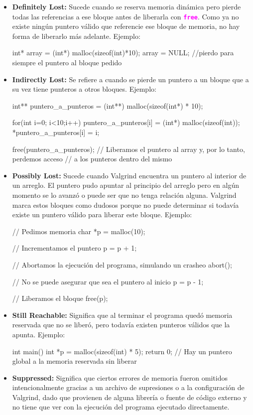 \documentclass[]{scrartcl}
\newcommand{\hl}[1]{\textcolor{magenta}{\textbf{\texttt{#1}}}}
\begin{document}
\begin{itemize}
  \item \textbf{Definitely Lost:} Sucede cuando se reserva memoria dinámica pero pierde todas las referencias a ese bloque antes de liberarla con \hl{free}. Como ya no existe ningún puntero válido que referencie ese bloque de memoria, no hay forma de liberarlo más adelante. Ejemplo:
  \begin{cbox}[]{}
    int* array = (int*) malloc(sizeof(int)*10);
    array = NULL; //pierdo para siempre el puntero al bloque pedido
  \end{cbox}
  \item \textbf{Indirectly Lost:} Se refiere a cuando se pierde un puntero a un bloque que a su vez tiene punteros a otros bloques. Ejemplo:
  \begin{cbox}[]{}
    int** puntero_a_punteros = (int**) malloc(sizeof(int*) * 10);

    for(int i=0; i<10;i++){
        puntero_a_punteros[i] = (int*) malloc(sizeof(int));
        *puntero_a_punteros[i] = i;
    }

    free(puntero_a_punteros); 
    // Liberamos el puntero al array y, por lo tanto, perdemos acceso 
    // a los punteros dentro del mismo                          
  \end{cbox}
  \item \textbf{Possibly Lost:} Sucede cuando Valgrind encuentra un puntero al interior de un arreglo. El puntero pudo apuntar al principio del arreglo pero en algún momento se lo avanzó o puede ser que no tenga relación alguna. Valgrind marca estos bloques como dudosos porque no puede determinar si todavía existe un puntero válido para liberar este bloque. Ejemplo:
  \begin{cbox}[]{}
    // Pedimos memoria
    char *p = malloc(10);

    // Incrementamos el puntero
    p = p + 1;

    // Abortamos la ejecución del programa, simulando un crasheo
    abort();

    // No se puede asegurar que sea el puntero al inicio
    p = p - 1;

    // Liberamos el bloque
    free(p);
  \end{cbox}
  \item \textbf{Still Reachable:} Significa que al terminar el programa quedó memoria reservada que no se liberó, pero todavía existen punteros válidos que la apunta. Ejemplo:
  \begin{cbox}[]{}
    int main() {
        int *p = malloc(sizeof(int) * 5);
        return 0; 
        // Hay un puntero global a la memoria reservada sin liberar
    }
  \end{cbox}
  \item \textbf{Suppressed:} Significa que ciertos errores de memoria fueron omitidos intencionalmente gracias a un archivo de supresiones o a la configuración de Valgrind, dado que provienen de alguna librería o fuente de código externo y no tiene que ver con la ejecución del programa ejecutado directamente.
\end{itemize}
\end{document}
